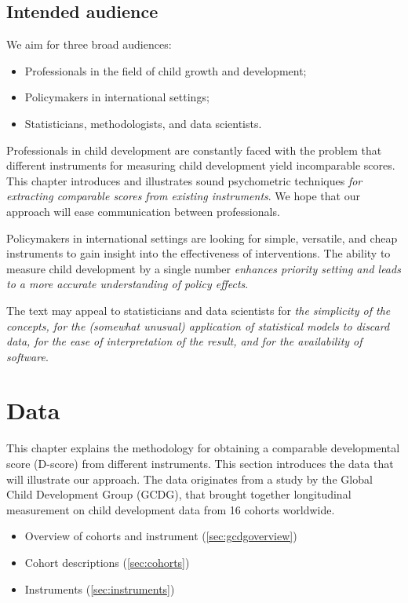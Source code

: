 \documentclass[
]{book}
\providecommand{\tightlist}{%
  \setlength{\itemsep}{0pt}\setlength{\parskip}{0pt}}
\begin{document}
\hypertarget{sec:audience}{%
\section{Intended audience}\label{sec:audience}}

We aim for three broad audiences:

\begin{itemize}
\tightlist
\item
  Professionals in the field of child growth and development;
\item
  Policymakers in international settings;
\item
  Statisticians, methodologists, and data scientists.
\end{itemize}

Professionals in child development are constantly faced with the problem that different instruments for measuring child development yield incomparable scores. This chapter introduces and illustrates sound psychometric techniques \emph{for extracting comparable scores from existing instruments}. We hope that our approach will ease communication between professionals.

Policymakers in international settings are looking for simple, versatile, and cheap instruments to gain insight into the effectiveness of interventions. The ability to measure child development by a single number \emph{enhances priority setting and leads to a more accurate understanding of policy effects}.

The text may appeal to statisticians and data scientists for \emph{the simplicity of the concepts, for the (somewhat unusual) application of statistical models to discard data, for the ease of interpretation of the result, and for the availability of software}.

\newpage

\hypertarget{ch:data}{%
\chapter{Data}\label{ch:data}}

This chapter explains the methodology for obtaining a comparable developmental score (D-score) from different instruments. This section introduces the data that will illustrate our approach. The data originates from a study by the Global Child Development Group (GCDG), that brought together longitudinal measurement on child development data from 16 cohorts worldwide.

\begin{itemize}
\tightlist
\item
  Overview of cohorts and instrument (\ref{sec:gcdgoverview})
\item
  Cohort descriptions (\ref{sec:cohorts})
\item
  Instruments (\ref{sec:instruments})
\end{itemize}
\end{document}
